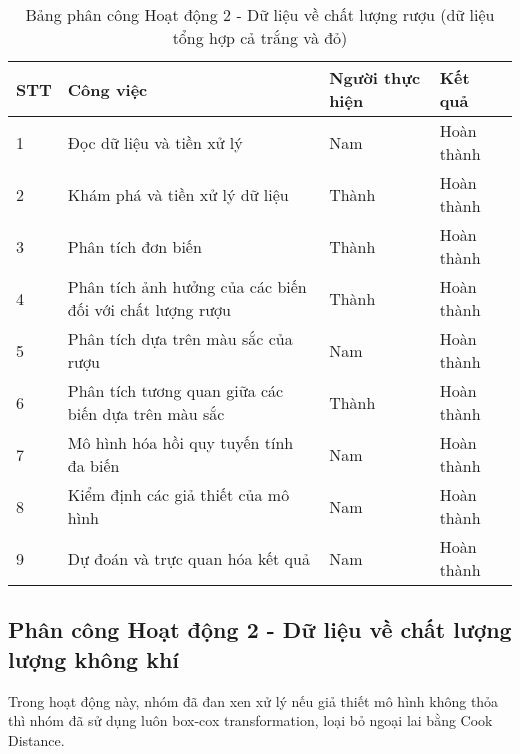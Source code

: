 \begin{table}[H]
    \centering 
    \caption{Bảng phân công Hoạt động 2 - Dữ liệu về chất lượng rượu (dữ liệu tổng hợp cả trắng và đỏ)}
    \label{tab:phancong4}
    \begin{tabular}{|l|l|l|l|}
    \hline
    STT & Công việc                                                   & Người thực hiện & Kết quả    \\ \hline
    1   & Đọc dữ liệu và tiền xử lý                                   & Nam             & Hoàn thành \\ \hline
    2   & Khám phá và tiền xử lý dữ liệu                              & Thành           & Hoàn thành \\ \hline
    3   & Phân tích đơn biến                                          & Thành           & Hoàn thành \\ \hline
    4   & Phân tích ảnh hưởng của các biến đối với chất lượng rượu    & Thành           & Hoàn thành \\ \hline
    5   & Phân tích dựa trên màu sắc của rượu                       & Nam           & Hoàn thành \\ \hline
    6   & Phân tích tương quan giữa các biến dựa trên màu sắc       & Thành           & Hoàn thành \\ \hline
    7   & Mô hình hóa hồi quy tuyến tính đa biến                    & Nam           & Hoàn thành \\ \hline
    8   & Kiểm định các giả thiết của mô hình                        & Nam           & Hoàn thành \\ \hline
    9  & Dự đoán và trực quan hóa kết quả                            & Nam             & Hoàn thành \\ \hline
    \end{tabular}
\end{table}



\subsection{Phân công Hoạt động 2 - Dữ liệu về chất lượng lượng không khí}

Trong hoạt động này, nhóm đã đan xen xử lý nếu giả thiết mô hình không thỏa thì nhóm đã sử dụng luôn box-cox transformation, loại bỏ ngoại lai bằng Cook Distance.

